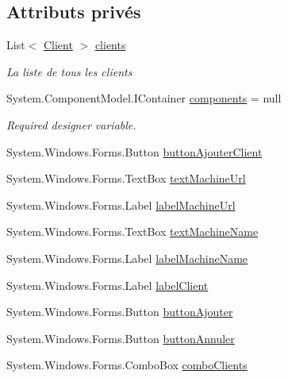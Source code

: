 \subsection*{Attributs privés}
\begin{DoxyCompactItemize}
\item 
List$<$ \mbox{\hyperlink{class_m_t_connect_agent_1_1_model_1_1_client}{Client}} $>$ \mbox{\hyperlink{class_m_t_connect_agent_1_1_form_modifie_machine_a62e4eec844c191c07dde494ceaeed749}{clients}}
\begin{DoxyCompactList}\small\item\em La liste de tous les clients \end{DoxyCompactList}\item 
System.\+Component\+Model.\+I\+Container \mbox{\hyperlink{class_m_t_connect_agent_1_1_form_modifie_machine_a4338fbfc4a2b9f5dd3951a1cf87eeaca}{components}} = null
\begin{DoxyCompactList}\small\item\em Required designer variable. \end{DoxyCompactList}\item 
System.\+Windows.\+Forms.\+Button \mbox{\hyperlink{class_m_t_connect_agent_1_1_form_modifie_machine_a31b77659e425ce23a26e24ed395cffac}{button\+Ajouter\+Client}}
\item 
System.\+Windows.\+Forms.\+Text\+Box \mbox{\hyperlink{class_m_t_connect_agent_1_1_form_modifie_machine_a14338a8a6226d58b4b74b75a78a81634}{text\+Machine\+Url}}
\item 
System.\+Windows.\+Forms.\+Label \mbox{\hyperlink{class_m_t_connect_agent_1_1_form_modifie_machine_a934d6cbe52246aa6fe5e40143565f677}{label\+Machine\+Url}}
\item 
System.\+Windows.\+Forms.\+Text\+Box \mbox{\hyperlink{class_m_t_connect_agent_1_1_form_modifie_machine_a44f2a8b0e78320ff5bc9dabf810c572e}{text\+Machine\+Name}}
\item 
System.\+Windows.\+Forms.\+Label \mbox{\hyperlink{class_m_t_connect_agent_1_1_form_modifie_machine_a5dd5828ef0178c40dbd0c74e2a5ec5db}{label\+Machine\+Name}}
\item 
System.\+Windows.\+Forms.\+Label \mbox{\hyperlink{class_m_t_connect_agent_1_1_form_modifie_machine_a2ad6243106d121056db9f2740c873c48}{label\+Client}}
\item 
System.\+Windows.\+Forms.\+Button \mbox{\hyperlink{class_m_t_connect_agent_1_1_form_modifie_machine_a0c2bf5042a7cd8d11e54e692bc76e9dc}{button\+Ajouter}}
\item 
System.\+Windows.\+Forms.\+Button \mbox{\hyperlink{class_m_t_connect_agent_1_1_form_modifie_machine_aaac46cad77c30ea981eb019aa70bae1a}{button\+Annuler}}
\item 
System.\+Windows.\+Forms.\+Combo\+Box \mbox{\hyperlink{class_m_t_connect_agent_1_1_form_modifie_machine_aff5f62a4da2c5d835d93fe47e021b853}{combo\+Clients}}
\end{DoxyCompactItemize}


